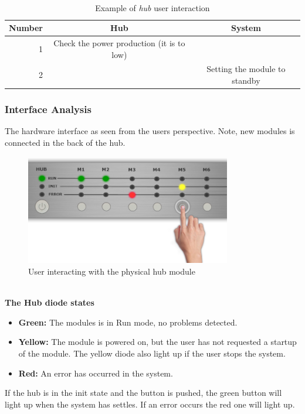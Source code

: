 		\\\begin{table}[h!]
					\begin{tabular}{| r | c | c |}
					\hline
					Number	& Hub				& System \\ \hline
					1		& Check the power production (it is to low)	& ~ \\ \hline
					2		& ~											& Setting the module to standby \\ \hline
					\end{tabular}
					\caption{Example of \textit{hub} user interaction}
				\end{table}	
	\subsubsection{Interface Analysis}
	The hardware interface as seen from the users perspective. Note, new modules is connected in the back of the hub.
		\begin{figure}[h!]		%
			\begin{centering}
				 \includegraphics[width=0.8\textwidth]{images/hub_user_interact.png}
				\caption{User interacting with the physical hub module}
		 	\end{centering}
		\end{figure}
		\\ \textbf{The Hub diode states}
		\begin{itemize}
			\item \textbf{Green: }The modules is in Run mode, no problems detected.
			\item \textbf{Yellow: }The module is powered on, but the user has not requested a startup of the module.
							The yellow diode also light up if the user stops the system.
			\item \textbf{Red: }An error has occurred in the system.
		\end{itemize}
		If the hub is in the init state and the button is pushed, the green button will light up when the system has settles. If an error occurs the red one will light up.
